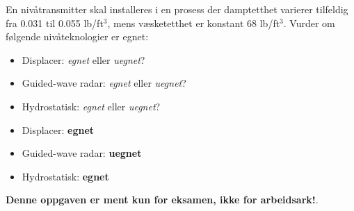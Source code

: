 

En nivåtransmitter skal installeres i en prosess der damptetthet varierer tilfeldig fra 0.031 til 0.055 lb/ft$^{3}$, mens væsketetthet er konstant 68 lb/ft$^{3}$. Vurder om følgende nivåteknologier er egnet:

\begin{itemize}
\item{} Displacer: {\it egnet} eller {\it uegnet}?
\vskip 10pt
\item{} Guided-wave radar: {\it egnet} eller {\it uegnet}?
\vskip 10pt
\item{} Hydrostatisk: {\it egnet} eller {\it uegnet}?
\end{itemize}







\begin{itemize}
\item{} Displacer: {\bf egnet}
\vskip 10pt
\item{} Guided-wave radar: {\bf uegnet}
\vskip 10pt
\item{} Hydrostatisk: {\bf egnet}
\end{itemize}







{\bf Denne oppgaven er ment kun for eksamen, ikke for arbeidsark!}.


